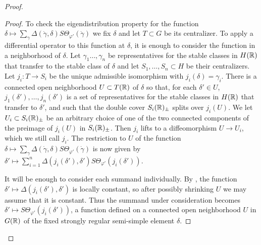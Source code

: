 \documentclass{article}
\theoremstyle{definition}
\numberwithin{equation}{section}
\renewcommand{\-}{\hyp{}}
\begin{document}
\begin{proof}
\begin{proof}
		To check the eigendistribution property for the function $\delta \mapsto \sum_\gamma \Delta(\dot\gamma,\delta)S\Theta_{\varphi'}(\dot\gamma)$ we fix $\delta$ and let $T \subset G$ be its centralizer. To apply a differential operator to this function at $\delta$, it is enough to consider the function in a neighborhood of $\delta$. Let $\gamma_1\dots,\gamma_n$ be representatives for the stable classes in $H(\mathbb{R})$ that transfer to the stable class of $\delta$ and let $S_1,\dots,S_n \subset H$ be their centralizers. Let $j_i : T \to S_i$ be the unique admissible isomorphism with $j_i(\delta)=\gamma_i$. There is a connected open neighborhood $U \subset T(\mathbb{R})$ of $\delta$ so that, for each $\delta' \in U$, $j_1(\delta'),\dots,j_n(\delta')$ is a set of representatives for the stable classes in $H(\mathbb{R})$ that transfer to $\delta'$, and such that the double cover $S_i(\mathbb{R})_\pm$ splits over $j_i(U)$. We let $U_i \subset S_i(\mathbb{R})_\pm$ be an arbitrary choice of one of the two connected components of the preimage of $j_i(U)$ in $S_i(\mathbb{R})_\pm$. Then $j_i$ lifts to a diffeomorphism $U \to U_i$, which we still call $j_i$. The restriction to $U$ of the function $\delta \mapsto \sum_\gamma \Delta(\dot\gamma,\delta)S\Theta_{\varphi'}(\dot\gamma)$ is now given by $\delta' \mapsto \sum_{i=1}^n \Delta(j_i(\delta'),\delta')S\Theta_{\varphi'}(j_i(\delta'))$. 
		
		It will be enough to consider each summand individually. By \cite[Corollary 4.3.4]{KalHDC}, the function $\delta' \mapsto \Delta(j_i(\delta'),\delta')$ is locally constant, so after possibly shrinking $U$ we may assume that it is constant. Thus the summand under consideration becomes $\delta' \mapsto S\Theta_{\varphi'}(j_i(\delta'))$, a function defined on a connected open neighborhood $U$ in $G(\mathbb{R})$ of the fixed strongly regular semi-simple element $\delta$.


\end{proof}
\end{proof}
\end{document}
